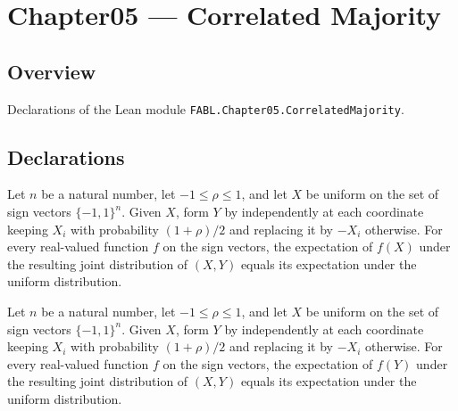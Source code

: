 \chapter{Chapter05 — Correlated Majority}
\section{Overview}

Declarations of the Lean module \texttt{FABL.Chapter05.CorrelatedMajority}.

\section{Declarations}

\begin{theorem}
\label{FABL.pmfExpectation_correlatedPairPMF_fst}
\leanok
{}
Let $n$ be a natural number, let $-1\leq\rho\leq1$, and let $X$ be uniform on the set of
sign vectors $\{-1,1\}^n$. Given $X$, form $Y$ by independently at each coordinate
keeping $X_i$ with probability $(1+\rho)/2$ and replacing it by $-X_i$ otherwise. For
every real-valued function $f$ on the sign vectors, the expectation of $f(X)$ under the
resulting joint distribution of $(X,Y)$ equals its expectation under the uniform
distribution.
\end{theorem}

\begin{theorem}
\label{FABL.pmfExpectation_correlatedPairPMF_snd}
\leanok
{}
Let $n$ be a natural number, let $-1\leq\rho\leq1$, and let $X$ be uniform on the set of
sign vectors $\{-1,1\}^n$. Given $X$, form $Y$ by independently at each coordinate
keeping $X_i$ with probability $(1+\rho)/2$ and replacing it by $-X_i$ otherwise. For
every real-valued function $f$ on the sign vectors, the expectation of $f(Y)$ under the
resulting joint distribution of $(X,Y)$ equals its expectation under the uniform
distribution.
\end{theorem}


